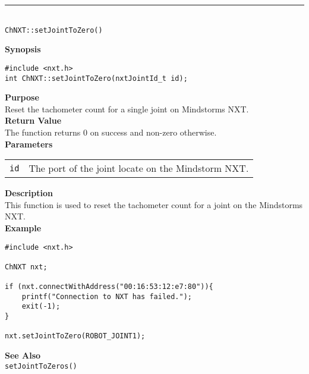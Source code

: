 \noindent
\vspace{5pt}
\rule{4.5in}{0.015in}\\
\noindent
{\LARGE \texttt{ChNXT::setJointToZero()} }\\


\noindent
{\bf Synopsis}
\vspace{-8pt}
\begin{verbatim}
#include <nxt.h>
int ChNXT::setJointToZero(nxtJointId_t id);
\end{verbatim}

\noindent
{\bf Purpose}\\
Reset the tachometer count for a single joint on Mindstorms NXT.\\

\noindent
{\bf Return Value}\\
The function returns 0 on success and non-zero otherwise.\\

\noindent
{\bf Parameters}\\
\vspace{-0.1in}
\begin{description}
\item
\begin{tabular}{p{20mm}p{135mm}}
\texttt{id} &The port of the joint locate on the Mindstorm NXT.\\
\end{tabular}
\end{description}

\noindent
{\bf Description}\\
This function is used to reset the tachometer count for a joint on the Mindstorms NXT.\\

\noindent
{\bf Example}
\begin{verbatim}
#include <nxt.h> 

ChNXT nxt;

if (nxt.connectWithAddress("00:16:53:12:e7:80")){
    printf("Connection to NXT has failed.");
    exit(-1);
}
    
nxt.setJointToZero(ROBOT_JOINT1);
\end{verbatim}

\noindent
{\bf See Also}\\
\texttt{setJointToZeros()}\\
